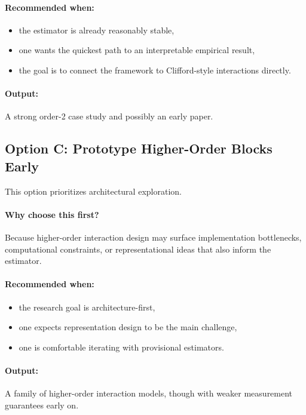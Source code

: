 \documentclass[11pt]{article}
\newcommand{\1}{\mathbf{1}}
\begin{document}
\paragraph{Recommended when:}
\begin{itemize}[leftmargin=1.5em]
    \item the estimator is already reasonably stable,
    \item one wants the quickest path to an interpretable empirical result,
    \item the goal is to connect the framework to Clifford-style interactions directly.
\end{itemize}

\paragraph{Output:}
A strong order-2 case study and possibly an early paper.

\subsection{Option C: Prototype Higher-Order Blocks Early}

This option prioritizes architectural exploration.

\paragraph{Why choose this first?}
Because higher-order interaction design may surface implementation bottlenecks, computational
constraints, or representational ideas that also inform the estimator.

\paragraph{Recommended when:}
\begin{itemize}[leftmargin=1.5em]
    \item the research goal is architecture-first,
    \item one expects representation design to be the main challenge,
    \item one is comfortable iterating with provisional estimators.
\end{itemize}

\paragraph{Output:}
A family of higher-order interaction models, though with weaker measurement guarantees early on.
\end{document}
